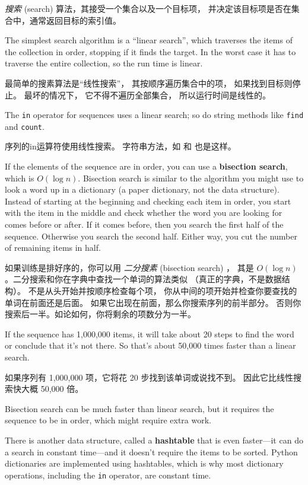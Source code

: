 { \em 搜索} (search) 算法，其接受一个集合以及一个目标项，
并决定该目标项是否在集合中，通常返回目标的索引值。
  

The simplest search algorithm is a ``linear search'', which traverses
the items of the collection in order, stopping if it finds the target.
In the worst case it has to traverse the entire collection, so the run
time is linear.

最简单的搜素算法是``线性搜索''， 其按顺序遍历集合中的项， 如果找到目标则停止。 最坏的情况下， 它不得不遍历全部集合， 所以运行时间是线性的。

The {\tt in} operator for sequences uses a linear search; so do string
methods like {\tt find} and {\tt count}.

序列的in运算符使用线性搜索。 字符串方法，如  和  也是这样。

If the elements of the sequence are in order, you can use a {\bf
  bisection search}, which is $O(\log n)$.  Bisection search is
similar to the algorithm you might use to look a word up in a
dictionary (a paper dictionary, not the data structure).  Instead of
starting at the beginning and checking each item in order, you start
with the item in the middle and check whether the word you are looking
for comes before or after.  If it comes before, then you search the
first half of the sequence.  Otherwise you search the second half.
Either way, you cut the number of remaining items in half.

如果训练是排好序的，你可以用 {\em 二分搜素} (bisection search) ，
其是 $O(\log n)$ 。二分搜索和你在字典中查找一个单词的算法类似
（真正的字典，不是数据结构）。 不是从头开始并按顺序检查每个项，
你从中间的项开始并检查你要查找的单词在前面还是后面。
如果它出现在前面，那么你搜索序列的前半部分。
否则你搜索后一半。如论如何，你将剩余的项数分为一半。
  

If the sequence has 1,000,000 items, it will take about 20 steps to
find the word or conclude that it's not there.  So that's about 50,000
times faster than a linear search.

如果序列有 1,000,000 项，它将花 20 步找到该单词或说找不到。
因此它比线性搜索快大概 50,000 倍。


Bisection search can be much faster than linear search, but
it requires the sequence to be in order, which might require
extra work.



There is another data structure, called a {\bf hashtable} that
is even faster---it can do a search in constant time---and it
doesn't require the items to be sorted.  Python dictionaries
are implemented using hashtables, which is why most dictionary
operations, including the {\tt in} operator, are constant time.


